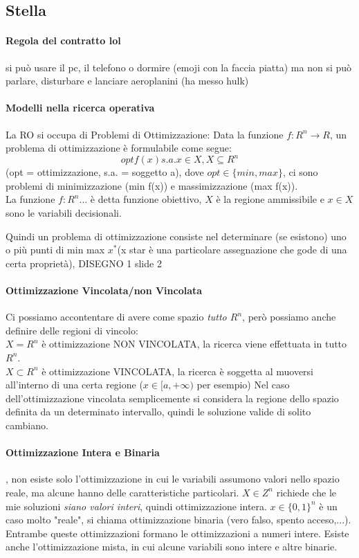 \documentclass[12pt, a4paper, openany]{book}
\begin{document}
\subsection*{Stella}
\paragraph*{Regola del contratto \small{lol}} si può usare il pc, il telefono o dormire (emoji con la faccia piatta) ma non si può parlare, disturbare e lanciare aeroplanini (ha messo hulk)

\paragraph*{Modelli nella ricerca operativa} La RO si occupa di Problemi di Ottimizzazione:
Data la funzione $f:R^n \to R$, un problema di ottimizzazione è formulabile come segue:
$$opt f(x) s.a. x\in X, X\subseteq R^n$$ 
(opt = ottimizzazione, s.a. = soggetto a), 
dove $opt \in \{min,max\}$, 
ci sono problemi di minimizzazione (min f(x)) e massimizzazione (max f(x)).
\\La funzione $f:R^n...$ è detta funzione obiettivo, $X$ è la regione ammissibile e $x\in X$ sono le variabili decisionali.

Quindi un problema di ottimizzazione consiste nel determinare (se esistono) uno o più punti di min max $x^*$(x star è una particolare assegnazione che gode di una certa proprietà),
{DISEGNO 1 slide 2}
\paragraph*{Ottimizzazione Vincolata/non Vincolata} Ci possiamo accontentare di avere come spazio \emph{tutto $R^n$}, però possiamo anche definire delle regioni di vincolo:
\\$X=R^n$ è ottimizzazione NON VINCOLATA, la ricerca viene effettuata in tutto $R^n$.
\\$X\subset R^n$ è ottimizzazione VINCOLATA, la ricerca è soggetta al muoversi all'interno di una certa regione ($x \in [a, +\infty)$ per esempio)
Nel caso dell'ottimizzazione vincolata semplicemente si considera la regione dello spazio definita da un determinato intervallo, quindi le soluzione valide di solito cambiano.
\paragraph*{Ottimizzazione Intera e Binaria}, non esiste solo l'ottimizzazione in cui le variabili assumono valori nello spazio reale, ma alcune hanno delle caratteristiche particolari.
$X\in Z^n$ richiede che le mie soluzioni \emph{siano valori interi}, quindi ottimizzazione intera.
$x\in \{0,1\}^n$ è un caso molto "reale", si chiama ottimizzazione binaria (vero falso, spento acceso,...). Entrambe queste ottimizzazioni formano le ottimizzazioni a numeri intere.
Esiste anche l'ottimizzazione mista, in cui alcune variabili sono intere e altre binarie.
\end{document}

